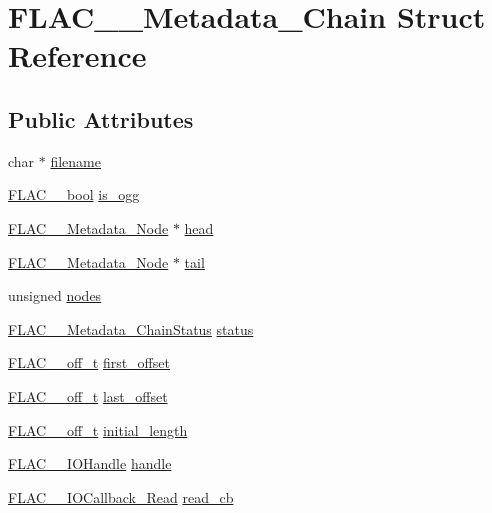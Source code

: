\hypertarget{struct_f_l_a_c_____metadata___chain}{}\section{F\+L\+A\+C\+\_\+\+\_\+\+Metadata\+\_\+\+Chain Struct Reference}
\label{struct_f_l_a_c_____metadata___chain}
\subsection*{Public Attributes}
\begin{DoxyCompactItemize}
\item 
char $\ast$ \hyperlink{struct_f_l_a_c_____metadata___chain_aaee82fae591aeb0b49df470776743c99}{filename}
\item 
\hyperlink{ordinals_8h_a95103469f1cbd78b8cf250194985b34e}{F\+L\+A\+C\+\_\+\+\_\+bool} \hyperlink{struct_f_l_a_c_____metadata___chain_a2534234284b7937fe2d0fc2a9d5f10be}{is\+\_\+ogg}
\item 
\hyperlink{struct_f_l_a_c_____metadata___node}{F\+L\+A\+C\+\_\+\+\_\+\+Metadata\+\_\+\+Node} $\ast$ \hyperlink{struct_f_l_a_c_____metadata___chain_a9514533fb8386d26d38991bb7e1aea46}{head}
\item 
\hyperlink{struct_f_l_a_c_____metadata___node}{F\+L\+A\+C\+\_\+\+\_\+\+Metadata\+\_\+\+Node} $\ast$ \hyperlink{struct_f_l_a_c_____metadata___chain_abbdb660c2b89c6716e528f9569f30860}{tail}
\item 
unsigned \hyperlink{struct_f_l_a_c_____metadata___chain_a9597bc065d2eb1fc9de84c856282b130}{nodes}
\item 
\hyperlink{group__flac__metadata__level2_gafe2a924893b0800b020bea8160fd4531}{F\+L\+A\+C\+\_\+\+\_\+\+Metadata\+\_\+\+Chain\+Status} \hyperlink{struct_f_l_a_c_____metadata___chain_aa3d88867863b83bcfd6f8ce21142b571}{status}
\item 
\hyperlink{libflac_2include_2share_2compat_8h_a125fb0105eee035da35c6a4999d140eb}{F\+L\+A\+C\+\_\+\+\_\+off\+\_\+t} \hyperlink{struct_f_l_a_c_____metadata___chain_ac9dd21a96d3031c7de984299d0e6ac8e}{first\+\_\+offset}
\item 
\hyperlink{libflac_2include_2share_2compat_8h_a125fb0105eee035da35c6a4999d140eb}{F\+L\+A\+C\+\_\+\+\_\+off\+\_\+t} \hyperlink{struct_f_l_a_c_____metadata___chain_ab8a6f0aad4feba119e868b6267824db0}{last\+\_\+offset}
\item 
\hyperlink{libflac_2include_2share_2compat_8h_a125fb0105eee035da35c6a4999d140eb}{F\+L\+A\+C\+\_\+\+\_\+off\+\_\+t} \hyperlink{struct_f_l_a_c_____metadata___chain_a9830ffb7fed2139f488d558875e6c3ac}{initial\+\_\+length}
\item 
\hyperlink{group__flac__callbacks_ga4c329c3168dee6e352384c5e9306260d}{F\+L\+A\+C\+\_\+\+\_\+\+I\+O\+Handle} \hyperlink{struct_f_l_a_c_____metadata___chain_aff61ff4560fd428cede2c10a33e53b3d}{handle}
\item 
\hyperlink{group__flac__callbacks_ga49d95218a6c09b215cd92cc96de71bf9}{F\+L\+A\+C\+\_\+\+\_\+\+I\+O\+Callback\+\_\+\+Read} \hyperlink{struct_f_l_a_c_____metadata___chain_a5a885df32c675b12f4b3309dc2fae365}{read\+\_\+cb}
\end{DoxyCompactItemize}


